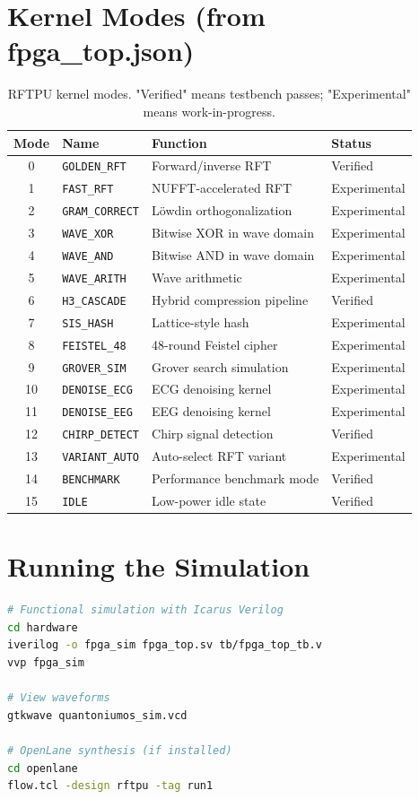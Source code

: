 \documentclass[11pt, a4paper, openany]{book}
\theoremstyle{definition}
\begin{document}
\section{Kernel Modes (from fpga\_top.json)}
\begin{table}[h]
\centering
\small
\begin{tabular}{@{}clll@{}}\toprule
Mode & Name & Function & Status \\ \midrule
0 & \texttt{GOLDEN\_RFT} & Forward/inverse RFT & Verified \\
1 & \texttt{FAST\_RFT} & NUFFT-accelerated RFT & Experimental \\
2 & \texttt{GRAM\_CORRECT} & Löwdin orthogonalization & Experimental \\
3 & \texttt{WAVE\_XOR} & Bitwise XOR in wave domain & Experimental \\
4 & \texttt{WAVE\_AND} & Bitwise AND in wave domain & Experimental \\
5 & \texttt{WAVE\_ARITH} & Wave arithmetic & Experimental \\
6 & \texttt{H3\_CASCADE} & Hybrid compression pipeline & Verified \\
7 & \texttt{SIS\_HASH} & Lattice-style hash & Experimental \\
8 & \texttt{FEISTEL\_48} & 48-round Feistel cipher & Experimental \\
9 & \texttt{GROVER\_SIM} & Grover search simulation & Experimental \\
10 & \texttt{DENOISE\_ECG} & ECG denoising kernel & Experimental \\
11 & \texttt{DENOISE\_EEG} & EEG denoising kernel & Experimental \\
12 & \texttt{CHIRP\_DETECT} & Chirp signal detection & Verified \\
13 & \texttt{VARIANT\_AUTO} & Auto-select RFT variant & Experimental \\
14 & \texttt{BENCHMARK} & Performance benchmark mode & Verified \\
15 & \texttt{IDLE} & Low-power idle state & Verified \\ \bottomrule
\end{tabular}
\caption{RFTPU kernel modes. "Verified" means testbench passes; "Experimental" means work-in-progress.}
\end{table}

\section{Running the Simulation}
\begin{lstlisting}[language=bash, caption={RFTPU Simulation Commands}]
# Functional simulation with Icarus Verilog
cd hardware
iverilog -o fpga_sim fpga_top.sv tb/fpga_top_tb.v
vvp fpga_sim

# View waveforms
gtkwave quantoniumos_sim.vcd

# OpenLane synthesis (if installed)
cd openlane
flow.tcl -design rftpu -tag run1
\end{lstlisting}
\end{document}
